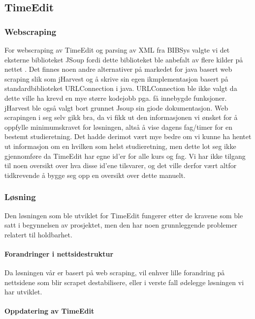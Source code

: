 \documentclass[../main.tex]{subfiles}
\begin{document}
\subsection{TimeEdit}

\subsubsection{Webscraping}

For webscraping av TimeEdit og parsing av XML fra BIBSys valgte vi det eksterne biblioteket JSoup fordi dette biblioteket ble anbefalt av flere kilder på nettet . Det finnes noen andre alternativer på markedet for java basert web scraping slik som jHarvest og å skrive sin egen ikmplementasjon basert på standardbiblioteket URLConnection i java. URLConnection ble ikke valgt da dette ville ha krevd en mye større kodejobb pga. få innebygde funksjoner. jHarvest ble også valgt bort grunnet Jsoup sin giode dokumentasjon. \newline
Web scrapingen i seg selv gikk bra, da vi fikk ut den informasjonen vi ønsket for å oppfylle minimumskravet for løsningen, altså å vise dagens fag/timer for en bestemt studieretning. Det hadde derimot vært mye bedre om vi kunne ha hentet ut informasjon om en hvilken som helst studieretning, men dette lot seg ikke gjennomføre da TimeEdit har egne id’er for alle kurs og fag. Vi har ikke tilgang til noen oversikt over hva disse id’ene tilsvarer, og det ville derfor vært altfor tidkrevende å bygge seg opp en oversikt over dette manuelt.

\subsubsection{Løsning}

Den løsningen som ble utviklet for TimeEdit fungerer etter de kravene som ble satt i begynnelsen av prosjektet, men den har noen grunnleggende problemer relatert til holdbarhet.

\paragraph{Forandringer i nettsidestruktur}

Da løsningen vår er basert på web scraping, vil enhver lille forandring på nettsidene som blir scrapet destabilisere, eller i verste fall ødelegge løsningen vi har utviklet. 

\paragraph{Oppdatering av TimeEdit}
\end{document}
